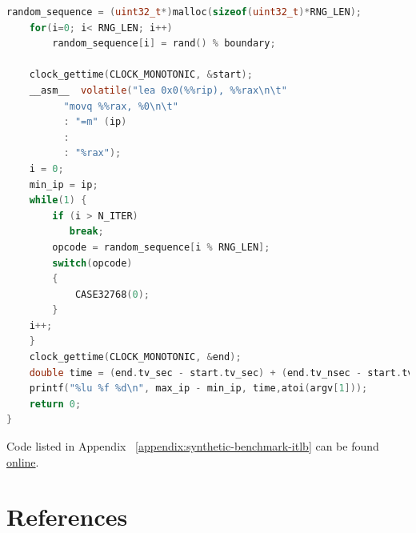 \documentclass[a4paper]{jpconf}
\begin{document}
\begin{appendices}
\begin{lstlisting}[caption=Synthetic benchmark using a code segment of adjustable size, language=c]
    random_sequence = (uint32_t*)malloc(sizeof(uint32_t)*RNG_LEN);
    for(i=0; i< RNG_LEN; i++)
        random_sequence[i] = rand() % boundary;

    clock_gettime(CLOCK_MONOTONIC, &start);
    __asm__  volatile("lea 0x0(%%rip), %%rax\n\t"
          "movq %%rax, %0\n\t"
          : "=m" (ip)
          :
          : "%rax");
    i = 0;
    min_ip = ip;
    while(1) {
        if (i > N_ITER)
           break;
        opcode = random_sequence[i % RNG_LEN];
        switch(opcode)
        {
            CASE32768(0);
        }
    i++;
    }
    clock_gettime(CLOCK_MONOTONIC, &end);
    double time = (end.tv_sec - start.tv_sec) + (end.tv_nsec - start.tv_nsec)/1000000000.0;
    printf("%lu %f %d\n", max_ip - min_ip, time,atoi(argv[1]));
    return 0;
}
\end{lstlisting}

Code listed in Appendix ~\ref{appendix:synthetic-benchmark-itlb} can be found 
\href{www.google.it}{online}.

\end{appendices}
\section*{References}


\end{document}
